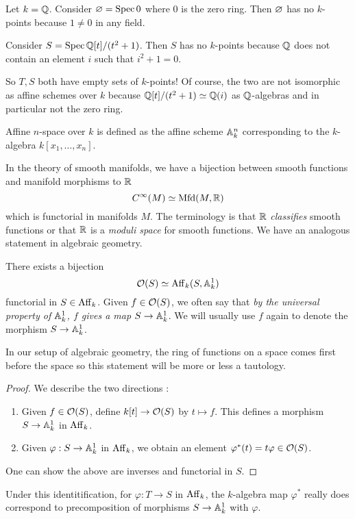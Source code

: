 \documentclass[./main.tex]{subfiles}
\begin{document}
\begin{eg}
  
  Let $k = \mathbb{Q}$.
  Consider $\varnothing = \operatorname{Spec} 0$ where $0$ is the zero ring.
  Then $\varnothing$ has no $k$-points because
  $1 \neq 0$ in any field.

  Consider $S = \operatorname{Spec} \mathbb{Q}[t] / (t^2 + 1)$.
  Then $S$ has no $k$-points because $\mathbb{Q}$ does not contain
  an element $i$ such that $i^2 + 1 = 0$.

  So $T, S$ both have empty sets of $k$-points!
  Of course, the two are not isomorphic as affine schemes over $k$
  because $\mathbb{Q}[t] / (t^2 + 1) \simeq \mathbb{Q}(i)$ as $\mathbb{Q}$-algebras
  and in particular not the zero ring.
\end{eg}

\begin{dfn}
  
  Affine $n$-space over $k$ is defined as 
  the affine scheme $\mathbb{A}^n_k$ corresponding to
  the $k$-algebra $k[x_1 , \dots , x_n]$.
\end{dfn}

In the theory of smooth manifolds,
we have a bijection between smooth functions and
manifold morphisms to $\mathbb{R}$ \[
  C^\infty(M) \simeq \mathrm{Mfd}(M , \mathbb{R})
\]
which is functorial in manifolds $M$.
The terminology is that $\mathbb{R}$ \emph{classifies}
smooth functions or
that $\mathbb{R}$ is a \emph{moduli space} for smooth functions.
We have an analogous statement in algebraic geometry.

\begin{prop}
  
  There exists a bijection
  \[
    \mathcal{O}(S) \simeq \mathrm{Aff}_k(S , \mathbb{A}^1_k)
  \]
  functorial in $S \in \mathrm{Aff}_k$.
  Given $f \in \mathcal{O}(S)$,
  we often say that \emph{by the universal property of $\mathbb{A}^1_k$, 
  $f$ gives a map $S \to \mathbb{A}^1_k$}.
  We will usually use $f$ again to denote the morphism $S \to \mathbb{A}^1_k$.
\end{prop}
In our setup of algebraic geometry,
the ring of functions on a space
comes first before the space
so this statement will be more or less a tautology.
\begin{proof}
  We describe the two directions : 
\begin{enumerate}
  \item Given $f \in \mathcal{O}(S)$,
  define $k[t] \to \mathcal{O}(S)$ by $t \mapsto f$.
  This defines a morphism
  $S \to \mathbb{A}^1_k$ in $\mathrm{Aff}_k$.
  \item Given $\varphi : S \to \mathbb{A}^1_k$ in $\mathrm{Aff}_k$,
  we obtain an element $\varphi^*(t) = t \varphi \in \mathcal{O}(S)$.
\end{enumerate}
One can show the above are inverses and
functorial in $S$.
\end{proof}
Under this identitification,
for $\varphi : T \to S$ in $\mathrm{Aff}_k$,
the $k$-algebra map $\varphi^*$ really does
correspond to precomposition of morphisms $S \to \mathbb{A}^1_k$
with $\varphi$.
\end{document}
